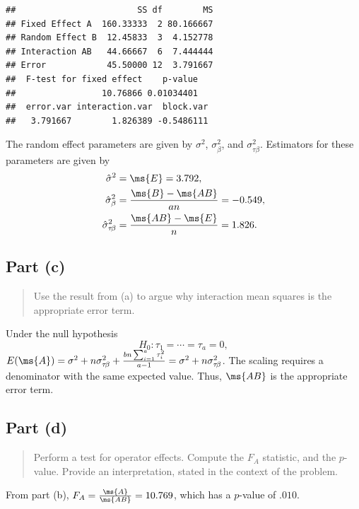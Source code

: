 \documentclass[
]{article}
\begin{document}
\begin{verbatim}
##                        SS df        MS
## Fixed Effect A  160.33333  2 80.166667
## Random Effect B  12.45833  3  4.152778
## Interaction AB   44.66667  6  7.444444
## Error            45.50000 12  3.791667
##  F-test for fixed effect    p-value
##                 10.76866 0.01034401
##  error.var interaction.var  block.var
##   3.791667        1.826389 -0.5486111
\end{verbatim}

The random effect parameters are given by \(\sigma^2\),
\(\sigma_\beta^2\), and \(\sigma_{\tau\beta}^2\). Estimators for these
parameters are given by \begin{align*}
  \hat\sigma^2               &= \ms{E}     = 3.792,\\
  \hat\sigma_{\beta}^2       &= \frac{\ms{B}-\ms{A B}}{a n} = -0.549,\\
  \hat\sigma_{\tau\!\beta}^2 &= \frac{\ms{A B}-\ms{E}}{n} = 1.826.
\end{align*}

\hypertarget{part-c-1}{%
\subsection{Part (c)}\label{part-c-1}}

\begin{quote}
Use the result from (a) to argue why interaction mean squares is the
appropriate error term.
\end{quote}

Under the null hypothesis \[
  H_0 : \tau_1 = \cdots = \tau_a = 0,
\]
\(E(\ms{A}) = \sigma^2 + n \sigma_{\tau \! \beta}^2 +  \frac{b n \sum_{i=1}^{a}\tau_i^2}{a-1} = \sigma^2 + n \sigma_{\tau\!\beta}^2\).
The scaling requires a denominator with the same expected value. Thus,
\(\ms{A B}\) is the appropriate error term.

\hypertarget{part-d-1}{%
\subsection{Part (d)}\label{part-d-1}}

\begin{quote}
Perform a test for operator effects. Compute the \(F_A\) statistic, and
the \(p\)-value. Provide an interpretation, stated in the context of the
problem.
\end{quote}

From part (b), \(F_A = \frac{\ms{A}}{\ms{A B}} = 10.769\), which has a
\(p\)-value of \(.010\).
\end{document}
